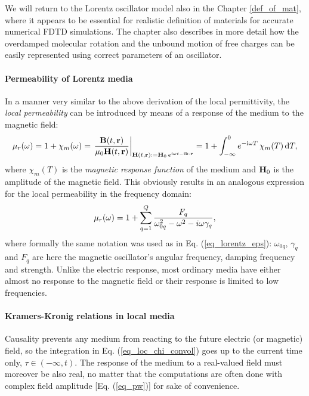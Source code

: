 We will return to the Lorentz oscillator model also in the Chapter \ref{def_of_mat}, where it appears to be essential for realistic definition of materials for accurate numerical FDTD simulations. The chapter also describes in more detail how the overdamped molecular rotation and the unbound motion of free charges can be easily represented using correct parameters of an oscillator.
\paragraph{Permeability of Lorentz media}  %
In a manner very similar to the above derivation of the local permittivity, the \textit{local permeability} can be introduced by means of a response of the medium to the magnetic field:
\begin{equation} \mu_r(\omega) = 1 + \chi_m(\omega) = \left.\frac{\mathbf{B}(t,{\mathbf{r}})}{\mu_0\mathbf{H}(t,{\mathbf{r}})} \right|_{\mathbf{H}(t, {\mathbf{r}}) := \mathbf{H}_0 \, e^{{\mathrm i}\omega t - {\mathrm i}{\mathbf{k}}\cdot{\mathbf{r}}}} = 1 + \int_{-\infty}^{0} e^{-{\mathrm i}\omega T} \,\chi_m(T) \,\mbox{d}T, \label{eq_mu_loc}\end{equation}
where $\chi_m(T)$ is the \textit{magnetic response function} of the medium and $\mathbf{H}_0$ is the amplitude of the magnetic field. This obviously results in an analogous expression for the local permeability in the frequency domain:
\begin{equation} \mu_r(\omega) = 1 + \sum_{q=1}^Q \frac{F_q}{\omega_{0q}^2 - \omega^2 - i\omega\gamma_q}, \label{eq_lorentz_mu}\end{equation} 
where formally the same notation was used as in  Eq. (\ref{eq_lorentz_eps}): $\omega_{0q}$, $\gamma_q$ and $F_q$ are here the magnetic oscillator's angular frequency, damping frequency and strength. Unlike the electric response, most ordinary media have either almost no response to the magnetic field or their response is limited to low frequencies.

\paragraph{Kramers-Kronig relations in local media}%
Causality prevents any medium from reacting to the future electric (or magnetic) field, so the integration in Eq. (\ref{eq_loc_chi_convol}) goes up to the current time only, $\tau \in (-\infty, t)$. The response of the medium to a real-valued field must moreover be also real, no matter that the computations are often done with complex field amplitude [Eq. (\ref{eq_pw})] for sake of convenience. 

